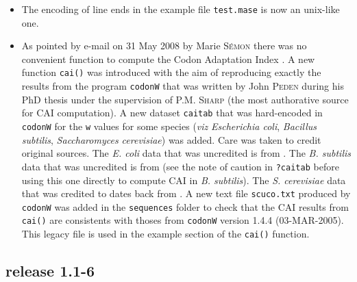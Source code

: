 \documentclass{article}
\begin{document}
\begin{itemize}
\item The encoding of line ends in the example file \texttt{test.mase}
  is now an unix-like one.

\item As pointed by e-mail on 31 May 2008 by Marie \textsc{S{\'e}mon} there was
  no convenient function to compute the Codon Adaptation Index \cite{CAI}.
  A new function \texttt{cai()} was introduced with the aim of reproducing
  exactly the results from the program \texttt{codonW} that was written
  by John \textsc{Peden} during his PhD thesis \cite{codonW} under the supervision 
  of P.M. \textsc{Sharp} (the most authorative source for CAI computation). A new 
  dataset \texttt{caitab} that was hard-encoded in \texttt{codonW} for
  the \texttt{w} values for some species (\textit{viz}
  \textit{Escherichia coli}, \textit{Bacillus subtilis},
  \textit{Saccharomyces cerevisiae}) was added. Care was taken to credit
  original sources. The \textit{E. coli} data that was uncredited is
  from \cite{CAI}. The \textit{B. subtilis} data that was uncredited
  is from \cite{ShieldsDC1987} (see the note of caution in \texttt{?caitab}
  before using this one directly to compute CAI in \textit{B. subtilis}). 
  The \textit{S. cerevisiae} data that was
  credited to \cite{SharpPM1991} dates back from \cite{CAI}. A new
  text file \texttt{scuco.txt} produced by \texttt{codonW} was added
  in the \texttt{sequences} folder to check that the CAI results from
  \texttt{cai()} are consistents with thoses from \texttt{codonW} version
  1.4.4 (03-MAR-2005). This legacy file is used in the example section of
  the \texttt{cai()} function.

\end{itemize}

\subsection*{release 1.1-6}
\end{document}

